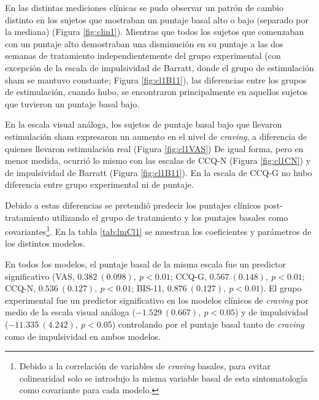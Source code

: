 En las distintas mediciones clínicas se pudo observar un patrón de cambio distinto en los sujetos que mostraban un puntaje basal alto o bajo (separado por la mediana) (Figura \ref{fig:clin1}). Mientras que todos los sujetos que comenzaban con un puntaje alto demostraban una disminución en su puntaje a las dos semanas de tratamiento independientemente del grupo experimental (con excepción de la escala de impulsividad de Barratt, donde el grupo de estimulación sham se mantuvo constante; Figura \ref{fig:cl1B11}), las diferencias entre los grupos de estimulación, cuando hubo, se encontraron principalmente en aquellos sujetos que tuvieron un puntaje basal bajo. \par
En la escala visual análoga, los sujetos de puntaje basal bajo que llevaron estimulación sham expresaron un aumento en el nivel de \textit{craving}, a diferencia de quienes llevaron estimulación real (Figura \ref{fig:cl1VAS}) De igual forma, pero en menor medida, ocurrió lo mismo con las escalas de CCQ-N (Figura \ref{fig:cl1CN}) y de impulsividad de Barratt (Figura \ref{fig:cl1B11}). En la escala de CCQ-G no hubo diferencia entre grupo experimental ni de puntaje. \par

Debido a estas diferencias se pretendió predecir los puntajes clínicos post-tratamiento utilizando el grupo de tratamiento y los puntajes basales como covariantes\footnote{Debido a la correlación de variables de \textit{craving} basales, para evitar colinearidad solo se introdujo la misma variable basal de esta sintomatología como covariante para cada modelo.}. En la tabla \ref{tab:lmCl1} se muestran los coeficientes y parámetros de los distintos modelos. \par
En todos los modelos, el puntaje basal de la misma escala fue un predictor significativo (VAS, $0.382\ (0.098),\ p<0.01$; CCQ-G, $0.567\ (0.148),\ p<0.01$; CCQ-N, $0.536\ (0.127),\ p<0.01$; BIS-11, $0.876\ (0.127),\ p<0.01$). El grupo experimental fue un predictor significativo en los modelos clínicos de \textit{craving} por medio de la escala visual análoga ($-1.529\ (0.667),\ p<0.05$) y de impulsividad ($-11.335\ (4.242),\ p<0.05$) controlando por el puntaje basal tanto de \textit{craving} como de impulsividad en ambos modelos.

